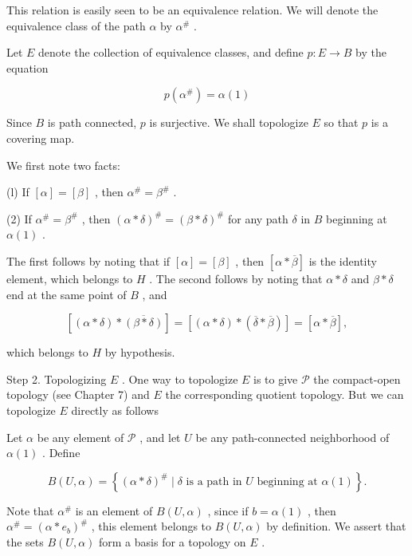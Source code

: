 \documentclass[10pt]{article}
\begin{document}
This relation is easily seen to be an equivalence relation. We will denote the equivalence class of the path \(\alpha\) by \({\alpha }^{\# }\) .

Let \(E\) denote the collection of equivalence classes, and define \(p : E \rightarrow  B\) by the equation

\[
p\left( {\alpha }^{\# }\right)  = \alpha \left( 1\right)
\]

Since \(B\) is path connected, \(p\) is surjective. We shall topologize \(E\) so that \(p\) is a covering map.

We first note two facts:

(l) If \(\left\lbrack  \alpha \right\rbrack   = \left\lbrack  \beta \right\rbrack\) , then \({\alpha }^{\# } = {\beta }^{\# }\) .

(2) If \({\alpha }^{\# } = {\beta }^{\# }\) , then \({\left( \alpha  * \delta \right) }^{\# } = {\left( \beta  * \delta \right) }^{\# }\) for any path \(\delta\) in \(B\) beginning at \(\alpha \left( 1\right)\) .

The first follows by noting that if \(\left\lbrack  \alpha \right\rbrack   = \left\lbrack  \beta \right\rbrack\) , then \(\left\lbrack  {\alpha  * \overline{\beta }}\right\rbrack\) is the identity element, which belongs to \(H\) . The second follows by noting that \(\alpha  * \delta\) and \(\beta  * \delta\) end at the same point of \(B\) , and

\[
\left\lbrack  {\left( {\alpha  * \delta }\right)  * \overline{\left( \beta  * \delta \right) }}\right\rbrack   = \left\lbrack  {\left( {\alpha  * \delta }\right)  * \left( {\overline{\delta } * \overline{\beta }}\right) }\right\rbrack   = \left\lbrack  {\alpha  * \overline{\beta }}\right\rbrack  ,
\]

which belongs to \(H\) by hypothesis.

Step 2. Topologizing \(E\) . One way to topologize \(E\) is to give \(\mathcal{P}\) the compact-open topology (see Chapter 7) and \(E\) the corresponding quotient topology. But we can topologize \(E\) directly as follows

Let \(\alpha\) be any element of \(\mathcal{P}\) , and let \(U\) be any path-connected neighborhood of \(\alpha \left( 1\right)\) . Define

\[
B\left( {U,\alpha }\right)  = \left\{  {{\left( \alpha  * \delta \right) }^{\# } \mid  \delta \text{ is a path in }U\text{ beginning at }\alpha \left( 1\right) }\right\}  .
\]

Note that \({\alpha }^{\# }\) is an element of \(B\left( {U,\alpha }\right)\) , since if \(b = \alpha \left( 1\right)\) , then \({\alpha }^{\# } = {\left( \alpha  * {e}_{b}\right) }^{\# }\) , this element belongs to \(B\left( {U,\alpha }\right)\) by definition. We assert that the sets \(B\left( {U,\alpha }\right)\) form a basis for a topology on \(E\) .
\end{document}
